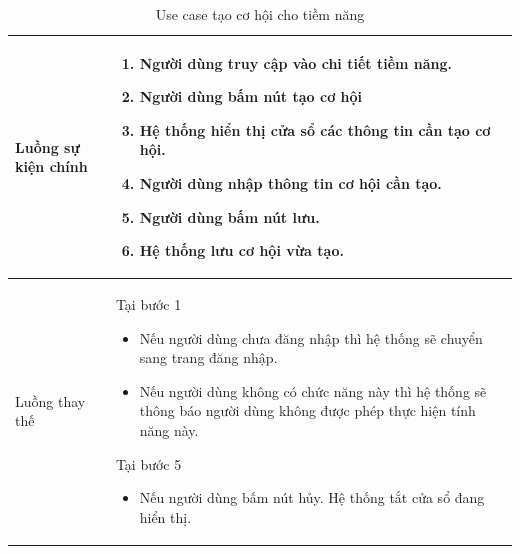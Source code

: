 \documentclass[12pt,a4paper]{article}
\begin{document}
\begin{table}[H]
\begin{tabular}{|p{3.5cm}|p{11.5cm}|c|}
            Luồng sự kiện chính & \vspace{-.8cm}\begin{enumerate}
                                                    \item Người dùng truy cập vào chi tiết tiềm năng.
                                                    \item Người dùng bấm nút tạo cơ hội
                                                    \item Hệ thống hiển thị cửa sổ các thông tin cần tạo cơ hội.
                                                    \item Người dùng nhập thông tin cơ hội cần tạo.
                                                    \item Người dùng bấm nút lưu.
                                                    \item Hệ thống lưu cơ hội vừa tạo.
            \end{enumerate}
            \\
            \hline
            Luồng thay thế & Tại bước 1\newline
            \vspace{-.8cm}\begin{itemize}
                              \item Nếu người dùng chưa đăng nhập thì hệ thống sẽ chuyển sang trang đăng nhập.
                              \item Nếu người dùng không có chức năng này thì hệ thống sẽ thông báo người dùng không được phép thực hiện tính năng này.
            \end{itemize}
            Tại bước 5\newline
            \vspace{-.8cm}\begin{itemize}
                              \item Nếu người dùng bấm nút hủy. Hệ thống tắt cửa sổ đang hiển thị.
            \end{itemize}
            \\ \hline
        \end{tabular}
        \caption{Use case tạo cơ hội cho tiềm năng}

    \end{table}

\end{document}
